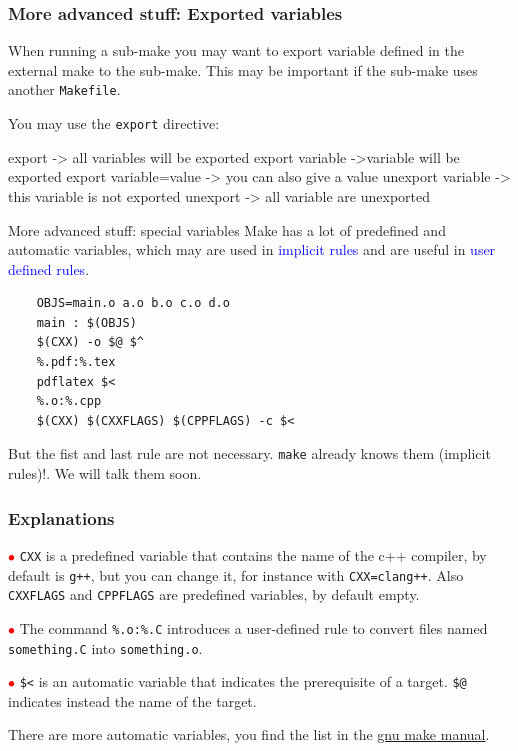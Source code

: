 \documentclass[10pt,aspectratio=169]{beamer}
\newcommand{\blue}{\color{blue}}
\begin{document}
\begin{frame}[fragile]
  \frametitle{More advanced stuff: Exported variables}

  When running a sub-make you may want to export variable defined in the
  external make to the sub-make. This may be important if the
  sub-make uses another \texttt{Makefile}.

You may use the  \texttt{export} directive:
\begin{semiverbatim}
export  -> all variables will be exported
export variable ->variable will be exported
export variable=value -> you can also give a value
unexport variable -> this variable is not exported
unexport -> all variable are unexported
\end{semiverbatim}

\end{frame}


\begin{frame}[fragile]{More advanced stuff: special variables}
    Make has a lot of \alert{predefined} and \alert{automatic variables}, which may are used
    in \textcolor{blue}{implicit rules} and are useful in
    \textcolor{blue}{user defined rules}. 
    \begin{verbatim}
    OBJS=main.o a.o b.o c.o d.o
    main : $(OBJS)
    $(CXX) -o $@ $^
    %.pdf:%.tex
    pdflatex $<
    %.o:%.cpp
    $(CXX) $(CXXFLAGS) $(CPPFLAGS) -c $<
    \end{verbatim}
    
    But the fist and last rule are {\blue not necessary}. \texttt{make} already knows them (\alert{implicit rules})!. We will talk them soon.
\end{frame}

\begin{frame}[fragile]
    \frametitle{Explanations}
    \textcolor{red}{$\bullet$} \verb!CXX! is a \alert{predefined variable} that contains the name of the c++ compiler, by default is \texttt{g++}, but you can change it, for instance with \verb!CXX=clang++!.
    Also \texttt{CXXFLAGS} and \texttt{CPPFLAGS} are predefined variables, by default empty.
    \smallskip
    
    \textcolor{red}{$\bullet$} The command \verb!%.o:%.C! introduces a \alert{user-defined rule} to convert files named \texttt{something.C} into \texttt{something.o}.
    \smallskip
    
    \textcolor{red}{$\bullet$} \verb!$<! is an \alert{automatic variable} that indicates the prerequisite of a target. \verb!$@! indicates instead the name of the target.
    \smallskip
    
    There are more automatic variables, you find the list in the \href{https://www.gnu.org/software/make/manual/html_node/Automatic-Variables.html#index-automatic-variables}{gnu make manual}.
\end{frame}
\end{document}
